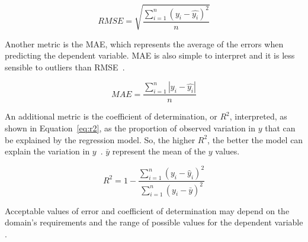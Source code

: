 \begin{equation}
    RMSE = \sqrt{\frac{\sum_{i=1}^{n}(y_i - \hat{y_i})^2}{n}} \label{eq:rmse}
\end{equation}

Another metric is the \gls{MAE}, which represents the average of the errors when predicting the dependent variable.  \gls{MAE} is also simple to interpret and it is less sensible to outliers than \gls{RMSE}~\cite{Chai2014}.

\begin{equation}
    MAE = \frac{\sum_{i=1}^{n}|y_i - \hat{y_i}|}{n} \label{eq:mae}
\end{equation}

An additional metric is the coefficient of determination, or $R^2$, interpreted, as shown in Equation~\ref{eq:r2}, as the proportion of observed variation in $y$ that can be explained by the regression model. So, the higher $R^2$, the better the model can explain the variation in $y$~\cite{Devore2011}. $\bar{y}$ represent the mean of the $y$ values.

\begin{equation}
    R^2=1-\frac{\sum_{i=1}^{n}(y_i-\hat{y}_i)^2}{\sum_{i=1}^{n}(y_i - \bar{y})^2} \label{eq:r2}
\end{equation}

Acceptable values of error and  coefficient of determination  may depend on the domain's requirements and the range of possible values for the dependent variable \cite{Zhou2011, Torres2005}.



